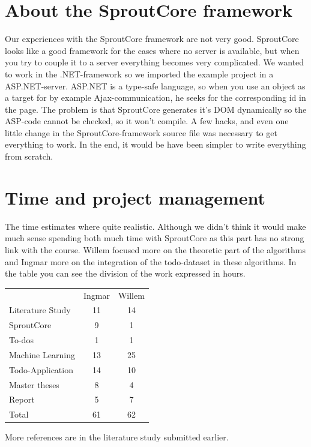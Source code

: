 \documentclass[a4paper,titlepage]{article}
\begin{document}
\section{About the SproutCore framework}
Our experiences with the SproutCore framework are not very good. SproutCore looks like a good framework for the cases where no server is available, but when you try to couple it to a server everything becomes very complicated. We wanted to work in the .NET-framework so we imported the example project in a ASP.NET-server. ASP.NET is a type-safe language, so when you use an object as a target for by example Ajax-communication, he seeks for the corresponding id in the page. 
The problem is that SproutCore generates it's DOM dynamically so the ASP-code cannot be checked, so it won't compile. A few hacks, and even one little change in the SproutCore-framework source file was necessary to get everything to work. In the end, it would be have been simpler to write everything from scratch. 

\section{Time and project management}
The time estimates where quite realistic. Although we didn't think it would make much sense spending both much time with SproutCore as this part has no strong link with the course. Willem focused more on the theoretic part of the algorithms and Ingmar more on the integration of the todo-dataset in these algorithms. In the table you can see the division of the work expressed in hours.
\begin{table}[H]
\centering
\begin{tabular}{lcc}
&Ingmar&Willem \\
Literature Study & 11 & 14\\
SproutCore & 9 & 1\\
To-dos & 1 & 1\\
Machine Learning & 13 & 25\\
Todo-Application & 14 & 10 \\
Master theses & 8 & 4\\
Report & 5 & 7\\
\hline
Total & 61 & 62
\end{tabular}
\end{table}

\nocite{*}


More references are in the literature study submitted earlier.
\end{document}

